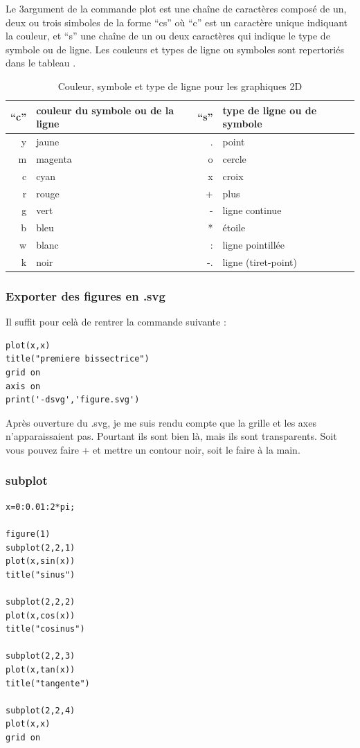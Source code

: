 \documentclass[a4paper,twoside]{article}
\begin{document}
Le 3\ieme argument de la commande plot est une chaîne de caractères composé de un, deux ou trois simboles de la forme ``cs'' où ``c'' est un caractère unique indiquant la couleur, et ``s'' une chaîne de un ou deux caractères qui indique le type de symbole ou de ligne. Les couleurs et types de ligne ou symboles sont repertoriés dans le tableau .

\begin{table}[htb]
\centering
\begin{tabular}{rp{4cm}||rp{4cm}}
``c'' & couleur du symbole ou de la ligne & ``s'' & type de ligne ou de symbole\\\hline
y & jaune & . & point\\
m & magenta & o & cercle\\
c & cyan & x & croix\\
r & rouge & + & plus\\
g & vert & - & ligne continue\\
b & bleu & * & étoile\\
w & blanc & : & ligne pointillée\\
k & noir & -. & ligne (tiret-point)
\end{tabular}
\caption{Couleur, symbole et type de ligne pour les graphiques 2D}\label{tab:matlab_symbole}
\end{table}


\subsubsection{Exporter des figures en .svg}
Il suffit pour celà de rentrer la commande suivante :
\begin{verbatim}
plot(x,x)
title("premiere bissectrice")
grid on
axis on
print('-dsvg','figure.svg')
\end{verbatim}

\begin{remarque}
Après ouverture du .svg, je me suis rendu compte que la grille et les axes n'apparaissaient pas. Pourtant ils sont bien là, mais ils sont transparents. Soit vous pouvez faire + et mettre un contour noir, soit le faire à la main.
\end{remarque}

\subsubsection{subplot}
\begin{verbatim}
x=0:0.01:2*pi;

figure(1)
subplot(2,2,1)
plot(x,sin(x))
title("sinus")

subplot(2,2,2)
plot(x,cos(x))
title("cosinus")

subplot(2,2,3)
plot(x,tan(x))
title("tangente")

subplot(2,2,4)
plot(x,x)
grid on
\end{verbatim}
\end{document}
